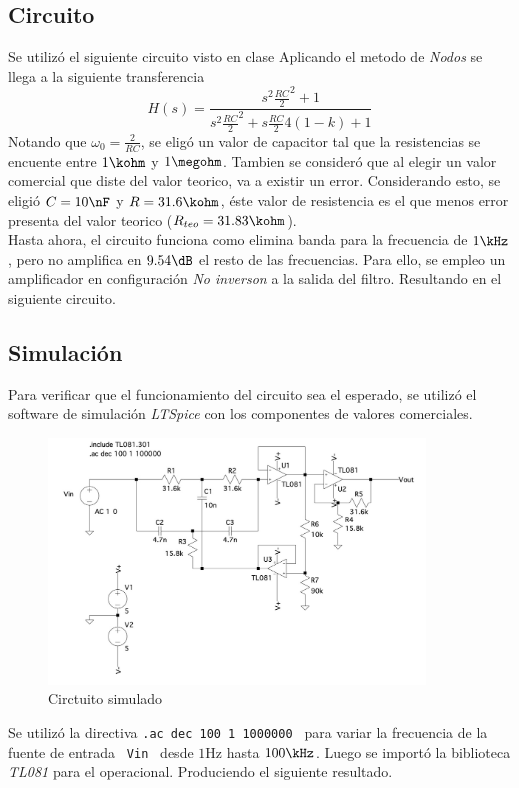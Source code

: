 \subsection*{Circuito}
Se utiliz\'o el siguiente circuito visto en clase
Aplicando el metodo de \textit{Nodos} se llega a la siguiente transferencia
\begin{equation}
  H(s) = \frac{s^2 \frac{RC}{2}^2+1}{s^2 \frac{RC}{2}^2+s \frac{RC}{2} 4(1-k)+1}
\end{equation}
	Notando que $\omega_0 = \frac{2}{RC}$, se elig\'o  un valor de capacitor tal que la resistencias se encuente entre $1\kohm$ y $1\megohm$. Tambien se consider\'o  que al elegir un valor comercial que diste del valor teorico, va a existir un error. Considerando esto, se eligi\'o $C= 10 \nF$ y $R= 31.6 \kohm$, \'este valor de resistencia es el que menos error presenta del valor teorico ($R_{teo}=31.83 \kohm$).\\
	Hasta ahora, el circuito funciona como elimina banda para la frecuencia de $1\kHz$, pero no amplifica en $9.54 \dB$ el resto de las frecuencias. Para ello, se empleo un amplificador en configuraci\'on \textit{No inverson} a la salida del filtro. Resultando en el siguiente circuito.

\subsection*{Simulaci\'on}
	Para verificar que el funcionamiento del circuito sea el esperado, se utiliz\'o el software de simulaci\'on \textit{LTSpice} con los componentes de valores comerciales. 
\begin{figure}[hbt]
	\centering
	\includegraphics[width=10cm]{imagenes/simulacion}
	\caption{Circtuito simulado}
\end{figure}

	
Se utiliz\'o la directiva \texttt{.ac dec 100 1 1000000 } para
variar la  frecuencia de la fuente de entrada \texttt{ Vin } desde  $1 \si{\hertz}$ hasta $100 \kHz$. Luego se import\'o la biblioteca \textit{TL081} para el operacional. Produciendo el siguiente resultado.

